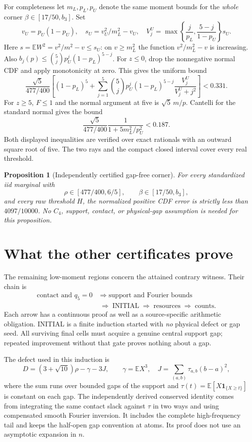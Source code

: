 \documentclass[11pt,a4paper]{article}
\newtheorem{proposition}[theorem]{Proposition}
\theoremstyle{definition}
\newcommand{\E}{\mathbb E}
\newcommand{\ind}{\mathbf 1}
\begin{document}
For completeness let $m_L,p_L,p_U$ denote the same moment bounds for the
\emph{whole} corner $\beta\in[17/50,b_3]$. Set
\[
 v_U=p_U(1-p_U),\quad s_U=v_U^2/m_L^2-v_U,\quad
 V^U_j=\max\left\{\frac j{p_L},\frac{5-j}{1-p_U}\right\}s_U.
\]
Here $s=\E W^2=v^2/m^2-v\le s_U$: on $v\ge m_L^2$ the function
$v^2/m_L^2-v$ is increasing. Also
$b_j(p)\le\binom5j p_U^j(1-p_L)^{5-j}$.
For $z\le0$, drop the nonnegative normal CDF and apply monotonicity at
zero. This gives the uniform bound
\[
 \frac{\sqrt5}{477/400}
 \left[(1-p_L)^5+\sum_{j=1}^5\binom5j p_U^j(1-p_L)^{5-j}
 \frac{V^U_j}{V^U_j+j^2}\right]<0.331.
\]
For $z\ge5$, $F\le1$ and the normal argument at five is
$\sqrt5\,m/p$. Cantelli for the standard normal gives the bound
\[
 \frac{\sqrt5}{477/400}\frac1{1+5m_L^2/p_U^2}<0.187.
\]
Both displayed inequalities are verified over exact rationals with an
outward square root of five. The two rays and the compact closed interval
cover every real threshold.

\begin{proposition}[Independently certified gap-free corner]
For every standardized iid marginal with
\[
 \rho\in[477/400,6/5],\qquad\beta\in[17/50,b_3],
\]
and every raw threshold $H$, the normalized positive CDF error is strictly
less than $4097/10000$. No $C_4$, support, contact, or physical-gap assumption
is needed for this proposition.
\end{proposition}

\section{What the other certificates prove}
The remaining low-moment regions concern the attained contrary witness.
Their chain is
\[
\begin{aligned}
 \text{contact and }q_5=0
 &\;\Longrightarrow\;\text{support and Fourier bounds}\\
 &\;\Longrightarrow\;\text{INITIAL}\;\Longrightarrow\;\text{resources}
 \;\Longrightarrow\;\text{counts}.
\end{aligned}
\]
Each arrow has a continuous proof as well as a source-specific arithmetic
obligation. INITIAL is a finite induction started with \emph{no} physical
defect or gap seed. All surviving final cells must acquire a genuine
central support gap; repeated improvement without that gate proves
nothing about a gap.

The defect used in this induction is
\[
 D=(3+\sqrt{10})\rho-\gamma-3J,\qquad
 \gamma=\E X^3,\quad J=\sum_{(a,b)}\tau_{a,b}(b-a)^2,
\]
where the sum runs over bounded gaps of the support and
$\tau(t)=\E[X\ind_{\{X\ge t\}}]$ is constant on each gap.
The independently derived conserved identity comes from integrating the
same contact slack against $\tau$ in two ways and using compensated smooth
Fourier inversion. It includes the complete high-frequency tail and
keeps the half-open gap convention at atoms. Its proof does not use an
asymptotic expansion in $n$.
\end{document}

